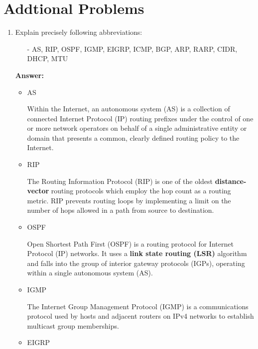 
\section{Addtional Problems}

\begin{enumerate}
    \item Explain precisely following abbreviations:
    \begin{itemize}
        \item[-] AS, RIP, OSPF, IGMP, EIGRP, ICMP, BGP, ARP, RARP, CIDR, DHCP, MTU
    \end{itemize}

    \textbf{Answer:}

    \begin{itemize}
        \item AS

        Within the Internet, an autonomous system (AS) is a collection of connected Internet Protocol (IP) routing prefixes under the control of one or more network operators on behalf of a single administrative entity or domain that presents a common, clearly defined routing policy to the Internet.

        \item RIP

        The Routing Information Protocol (RIP) is one of the oldest \textbf{distance-vector} routing protocols which employ the hop count as a routing metric. RIP prevents routing loops by implementing a limit on the number of hops allowed in a path from source to destination.

        \item OSPF

        Open Shortest Path First (OSPF) is a routing protocol for Internet Protocol (IP) networks. It uses a \textbf{link state routing (LSR)} algorithm and falls into the group of interior gateway protocols (IGPs), operating within a single autonomous system (AS).

        \item IGMP

        The Internet Group Management Protocol (IGMP) is a communications protocol used by hosts and adjacent routers on IPv4 networks to establish multicast group memberships.

        \item EIGRP


\end{itemize}
\end{enumerate}
